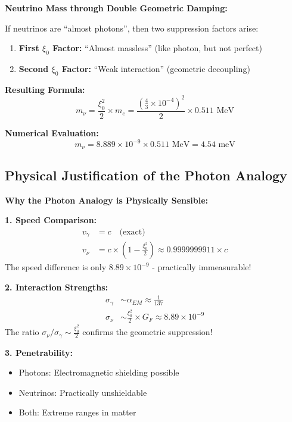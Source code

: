 \documentclass[12pt,a4paper]{article}
\begin{document}
	\begin{keyresult}
		\textbf{Neutrino Mass through Double Geometric Damping:}
		
		If neutrinos are ``almost photons'', then two suppression factors arise:
		
		\begin{enumerate}
			\item \textbf{First $\xi_0$ Factor:} ``Almost massless'' (like photon, but not perfect)
			\item \textbf{Second $\xi_0$ Factor:} ``Weak interaction'' (geometric decoupling)
		\end{enumerate}
		
		\textbf{Resulting Formula:}
		\begin{equation}
			\boxed{m_\nu = \frac{\xi_0^2}{2} \times m_e = \frac{(\frac{4}{3} \times 10^{-4})^2}{2} \times 0.511 \text{ MeV}}
		\end{equation}
		
		\textbf{Numerical Evaluation:}
		\begin{equation}
			m_\nu = 8.889 \times 10^{-9} \times 0.511 \text{ MeV} = 4.54 \text{ meV}
		\end{equation}
	\end{keyresult}
	
	\subsection{Physical Justification of the Photon Analogy}
	
	\begin{photon}
		\textbf{Why the Photon Analogy is Physically Sensible:}
		
		\textbf{1. Speed Comparison:}
		\begin{align}
			v_\gamma &= c \quad \text{(exact)} \\
			v_\nu &= c \times \left(1 - \frac{\xi_0^2}{2}\right) \approx 0.9999999911 \times c
		\end{align}
		The speed difference is only $8.89 \times 10^{-9}$ - practically immeasurable!
		
		\textbf{2. Interaction Strengths:}
		\begin{align}
			\sigma_\gamma &\sim \alpha_{EM} \approx \frac{1}{137} \\
			\sigma_\nu &\sim \frac{\xi_0^2}{2} \times G_F \approx 8.89 \times 10^{-9}
		\end{align}
		The ratio $\sigma_\nu/\sigma_\gamma \sim \frac{\xi_0^2}{2}$ confirms the geometric suppression!
		
		\textbf{3. Penetrability:}
		\begin{itemize}
			\item Photons: Electromagnetic shielding possible
			\item Neutrinos: Practically unshieldable
			\item Both: Extreme ranges in matter
		\end{itemize}
	\end{photon}
	
\end{document}

